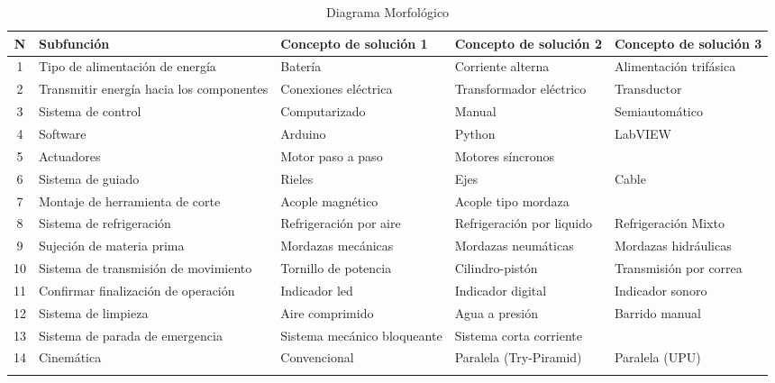 \begin{longtable}{| >{\columncolor[gray]{0.85}} c | >{\columncolor[gray]{0.85}} p{} | p{}   p{}   p{} |}
\hline \rowcolor[gray]{0.85}
 N & Subfunción                               & Concepto de solución 1      & Concepto de solución 2   & Concepto de solución 3 \\ \hline \endhead
 1 & Tipo de alimentación de energía          & Batería                     & Corriente alterna        & Alimentación trifásica \\ \hline
 2 & Transmitir energía hacia los componentes & Conexiones eléctrica        & Transformador eléctrico  & Transductor \\ \hline
 3 & Sistema de control                       & Computarizado               & Manual                   & Semiautomático\\ \hline
 4 & Software                                 & Arduino                     & Python                   & LabVIEW\\ \hline
 5 & Actuadores                               & Motor paso a paso           & Motores síncronos	       & \\ \hline
 6 & Sistema de guiado                        & Rieles                      & Ejes                     & Cable\\ \hline
 7 & Montaje de herramienta de corte          & Acople magnético            & Acople tipo mordaza      &\\  \hline
 8 & Sistema de refrigeración                 & Refrigeración por aire      & Refrigeración por liquido & Refrigeración Mixto\\ \hline
 9 & Sujeción de materia prima                & Mordazas mecánicas          & Mordazas neumáticas       & Mordazas hidráulicas \\ \hline
10 & Sistema de transmisión de movimiento     & Tornillo de potencia        & Cilindro-pistón           & Transmisión por correa\\ \hline
11 & Confirmar finalización de operación      & Indicador led               & Indicador digital         & Indicador sonoro \\ \hline
12 & Sistema de limpieza                      & Aire comprimido             & Agua a presión            & Barrido manual\\ \hline
13 & Sistema de parada de emergencia          & Sistema mecánico bloqueante & Sistema corta corriente   & \\ \hline
14 & Cinemática                               & Convencional                & Paralela (Try-Piramid)    & Paralela (UPU)\\ \hline
\caption{Diagrama Morfológico}
\label{table:DiagramaMorfologico}
\end{longtable}